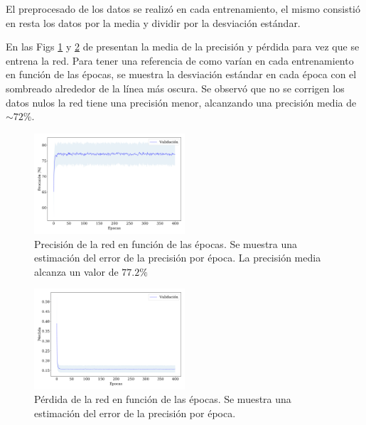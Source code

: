     El preprocesado de los datos se realizó en cada entrenamiento, el mismo consistió en resta los datos por la media y dividir por la desviación estándar.

    En las  Figs \ref{fig:ejer6_acc} y \ref{fig:ejer6_loss} de presentan la media de la precisión y pérdida para vez que se entrena la red. Para tener una referencia de como varían en cada entrenamiento en función de las épocas,  se muestra  la desviación estándar en cada época con el sombreado alrededor de la línea más oscura. Se observó que no se corrigen los datos nulos la red tiene una precisión menor, alcanzando una precisión media de $\sim 72\%$.

    \begin{figure}[H]
        \begin{small}
            \begin{center}
                \includegraphics[width=0.5\textwidth]{Graphs/ejer6_acc.pdf}
            \end{center}
            \caption{Precisión de la red en función de las épocas. Se muestra una estimación del error de la precisión por época. La precisión media alcanza un valor de $77.2\%$}
            \label{fig:ejer6_acc}
        \end{small}
    \end{figure}


    \begin{figure}[H]
        \begin{small}
            \begin{center}
                \includegraphics[width=0.5\textwidth]{Graphs/ejer6_loss.pdf}
            \end{center}
            \caption{Pérdida de la red en función de las épocas. Se muestra una estimación del error de la precisión por época.}
            \label{fig:ejer6_loss}
        \end{small}
    \end{figure}


